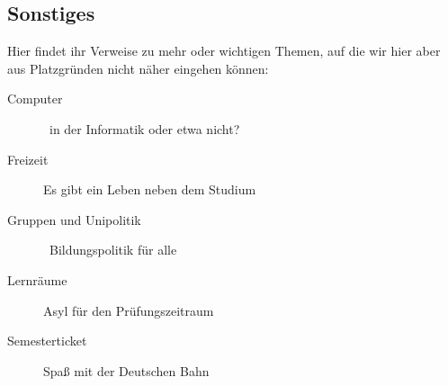 \subsection*{Sonstiges}
Hier findet ihr Verweise zu mehr oder wichtigen Themen, auf die wir hier
aber aus Platzgründen nicht näher eingehen können:
\begin{description}
\item[Computer]~in der Informatik oder etwa nicht?\\
  \item[Freizeit] Es gibt ein Leben neben dem Studium\\ 
\item[Gruppen und Unipolitik]~Bildungspolitik für alle\\
\item[Lernräume] Asyl für den Prüfungszeitraum\\
  \item[Semesterticket] Spaß mit der Deutschen Bahn\\
\end{description}

%  
%  
%  
%   
%  
%  
%  
%  
